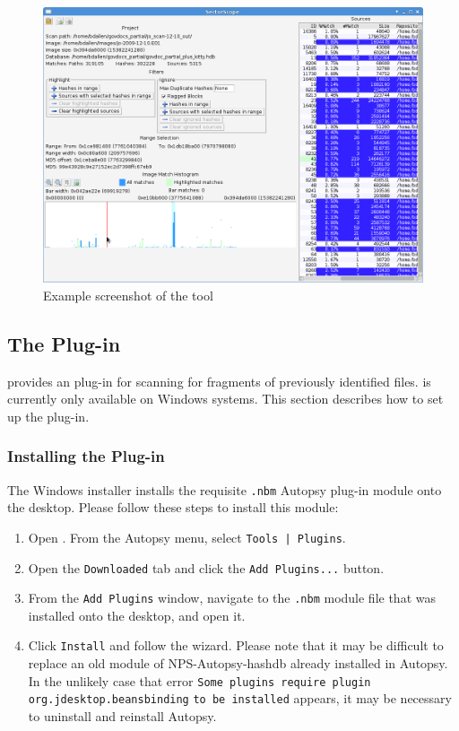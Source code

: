 \documentclass[11pt,fleqn]{article} %
\begin{document}
\begin{figure}
	\center
	\includegraphics[scale=.45]{drawings/SectorScope_main}
	\caption{Example screenshot of the \sscope tool}
	\label{fig:SectorScope_main}
\end{figure}

\subsection{The \sscope \aut Plug-in}
\sscope provides an \aut plug-in for scanning for fragments of previously identified files. \aut is currently only available on Windows systems. This section describes how to set up the \sscope \aut plug-in.

\subsubsection{Installing the \sscope Plug-in}
The \sscope Windows installer installs the requisite \verb+.nbm+ Autopsy plug-in module onto the desktop. Please follow these steps to install this module:

\begin{enumerate}
\item Open \aut. From the Autopsy menu, select \verb+Tools | Plugins+.
\item Open the \verb+Downloaded+ tab and click the \verb+Add Plugins...+ button.
\item From the \verb+Add Plugins+ window, navigate to the \verb+.nbm+ module file that was installed onto the desktop, and open it.
\item Click \verb+Install+ and follow the wizard. Please note that it may be difficult to replace an old module of NPS-Autopsy-hashdb already installed in Autopsy. In the unlikely case that error \verb+Some plugins require plugin org.jdesktop.beansbinding+ \verb+to be installed+ appears, it may be necessary to uninstall and reinstall Autopsy.
\end{enumerate}
\end{document}
